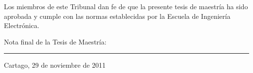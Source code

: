 \vfill

Los miembros de este Tribunal dan fe de que la presente tesis de
maestría ha sido aprobada y cumple con las normas establecidas por la
Escuela de Ingeniería Electrónica.

\vfill

\begin{center}
  Nota final de la Tesis de Maestría: \rule{3cm}{0.5pt}
\end{center}
\vfill

\begin{center}
  Cartago, 29 de noviembre de 2011\par
\end{center}

\cleardoublepage

